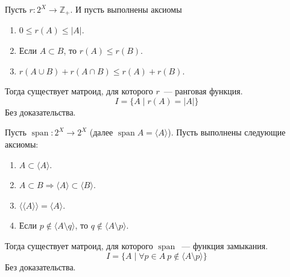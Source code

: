 \documentclass{article}
\begin{document}
    \begin{theorem}
        Пусть $r\colon 2^X\to\mathbb Z_+$. И пусть выполнены аксиомы
        \begin{enumerate}
            \item $0\leqslant r(A)\leqslant|A|$.
            \item Если $A\subset B$, то $r(A)\leqslant r(B)$.
            \item $r(A\cup B)+r(A\cap B)\leqslant r(A)+r(B)$.
        \end{enumerate}
        Тогда существует матроид, для которого $r$~--- ранговая функция.
        $$
        I=\{A\mid r(A)=|A|\}
        $$
        Без доказательства.
    \end{theorem}
    \begin{theorem}
        Пусть $\operatorname{span}\colon 2^X\to 2^X$ (далее $\operatorname{span}A=\langle A\rangle$). Пусть выполнены следующие аксиомы:
        \begin{enumerate}
            \item $A\subset \langle A\rangle$.
            \item $A\subset B\Rightarrow \langle A\rangle\subset\langle B\rangle$.
            \item $\langle\langle A\rangle\rangle=\langle A\rangle$.
            \item Если $p\notin\langle A\setminus q\rangle$, то $q\notin\langle A\setminus p\rangle$.
        \end{enumerate}
        Тогда существует матроид, для которого $\operatorname{span}$~--- функция замыкания.
        $$
        I=\{A\mid\forall p\in A~p\notin\langle A\setminus p\rangle\}
        $$
        Без доказательства.
    \end{theorem}
\end{document}
